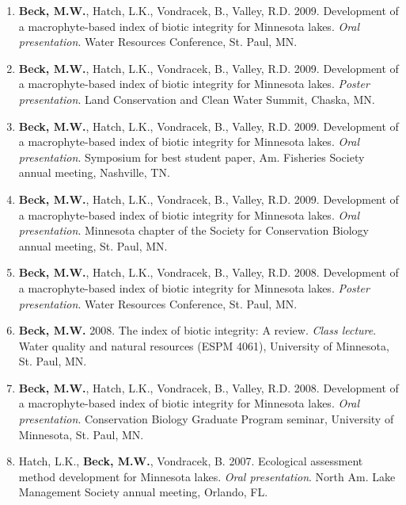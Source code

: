 \documentclass[letterpaper,12pt]{article}
\begin{document}
\begin{enumerate}
\item {\bf Beck, M.W.}, Hatch, L.K., Vondracek, B., Valley, R.D. 2009. Development of a macrophyte-based index of biotic integrity for Minnesota lakes. \textit{Oral presentation}. Water Resources Conference, St. Paul, MN.

\item {\bf Beck, M.W.}, Hatch, L.K., Vondracek, B., Valley, R.D. 2009. Development of a macrophyte-based index of biotic integrity for Minnesota lakes. \textit{Poster presentation}. Land Conservation and Clean Water Summit, Chaska, MN.

\item {\bf Beck, M.W.}, Hatch, L.K., Vondracek, B., Valley, R.D. 2009. Development of a macrophyte-based index of biotic integrity for Minnesota lakes. \textit{Oral presentation}. Symposium for best student paper, Am. Fisheries Society annual meeting, Nashville, TN.

\item {\bf Beck, M.W.}, Hatch, L.K., Vondracek, B., Valley, R.D. 2009. Development of a macrophyte-based index of biotic integrity for Minnesota lakes. \textit{Oral presentation}. Minnesota chapter of the Society for Conservation Biology annual meeting, St. Paul, MN.

\item {\bf Beck, M.W.}, Hatch, L.K., Vondracek, B., Valley, R.D. 2008. Development of a macrophyte-based index of biotic integrity for Minnesota lakes. \textit{Poster presentation}. Water Resources Conference, St. Paul, MN.

\item {\bf Beck, M.W.} 2008. The index of biotic integrity: A review. \textit{Class lecture}. Water quality and natural resources (ESPM 4061), University of Minnesota, St. Paul, MN.

\item {\bf Beck, M.W.}, Hatch, L.K., Vondracek, B., Valley, R.D. 2008. Development of a macrophyte-based index of biotic integrity for Minnesota lakes. \textit{Oral presentation}. Conservation Biology Graduate Program seminar, University of Minnesota, St. Paul, MN.

\item Hatch, L.K., {\bf Beck, M.W.}, Vondracek, B. 2007. Ecological assessment method development for Minnesota lakes. \textit{Oral presentation}. North Am. Lake Management Society annual meeting, Orlando, FL.

\end{enumerate}
\end{document}
